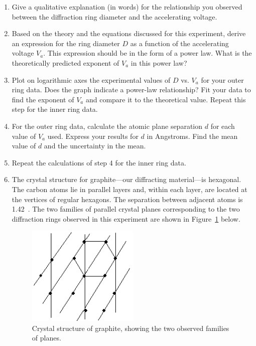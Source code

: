 \documentclass{tufte-handout}
\begin{document}
\begin{enumerate}
\item Give a qualitative explanation (in words) for the relationship you
  observed between the diffraction ring diameter and the accelerating
  voltage.

\item Based on the theory and the equations discussed for this experiment,
  derive an expression for the ring diameter $D$ as a function of the
  accelerating voltage $V_a$. This expression should be in the form of a power
  law.  What is the theoretically predicted exponent of $V_a$ in this power law?

\item Plot on logarithmic axes the experimental values of $D$ vs.  $V_a$ for
  your outer ring data. Does the graph indicate a power-law relationship? Fit
  your data to find the exponent of $V_a$ and compare it to the theoretical
  value. Repeat this step for the inner ring data.

\item For the outer ring data, calculate the atomic plane separation $d$ for
  each value of $V_a$ used. Express your results for $d$ in
  Angstroms. Find
  the mean value of $d$ and the uncertainty in the mean. 

\item Repeat the calculations of step 4 for the inner ring data. 

\item The crystal structure for graphite---our diffracting material---is
  hexagonal. The carbon atoms lie in parallel layers and, within each layer, are
  located at the vertices of regular hexagons.  The separation between adjacent
  atoms is 1.42~\angstrom.  The two families of parallel crystal planes
  corresponding to the two diffraction rings observed in this experiment are
  shown in Figure~\ref{fig:graphite} below.
\begin{figure}
\begin{centering}
\includegraphics[width=2.1in]{../images/ediffraction-img3.png} 
\caption{Crystal structure of graphite, showing the two observed families of
  planes.} 
\label{fig:graphite}
\end{centering}
\end{figure}


\end{enumerate}
\end{document}
